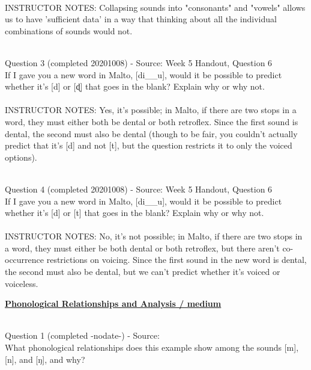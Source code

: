 \documentclass[12pt]{article}
\begin{document}
~\\
INSTRUCTOR NOTES: Collapsing sounds into "consonants" and "vowels" allows us to have 'sufficient data' in a way that thinking about all the individual combinations of sounds would not.


~\\

{\large Question 3} (completed 20201008) - Source: Week 5 Handout, Question 6\\

If I gave you a new word in Malto, [di\_\_u], would it be possible to predict whether it's [d] or [ɖ] that goes in the blank? Explain why or why not.\\


~\\
INSTRUCTOR NOTES: Yes, it's possible; in Malto, if there are two stops in a word, they must either both be dental or both retroflex. Since the first sound is dental, the second must also be dental (though to be fair, you couldn't actually predict that it's [d] and not [t], but the question restricts it to only the voiced options).


~\\

{\large Question 4} (completed 20201008) - Source: Week 5 Handout, Question 6\\

If I gave you a new word in Malto, [di\_\_u], would it be possible to predict whether it's [d] or [t] that goes in the blank? Explain why or why not.\\


~\\
INSTRUCTOR NOTES: No, it's not possible; in Malto, if there are two stops in a word, they must either be both dental or both retroflex, but there aren't co-occurrence restrictions on voicing. Since the first sound in the new word is dental, the second must also be dental, but we can't predict whether it's voiced or voiceless.


\newpage\textbf{\underline{\huge Phonological Relationships and Analysis / medium\\}}

~\\

{\large Question 1} (completed -nodate-) - Source: \\

What phonological relationships does this example show among the sounds [m], [n], and [ŋ], and why?\\
\end{document}
